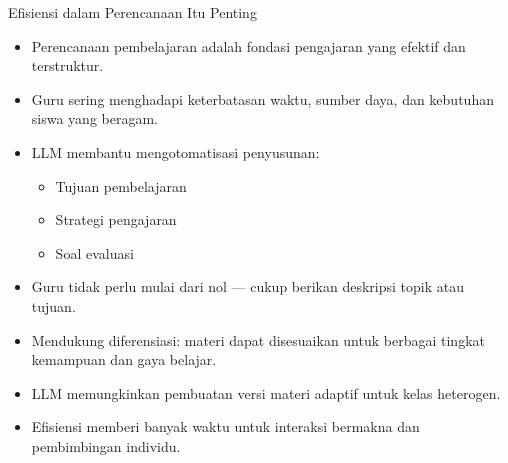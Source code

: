 \documentclass[aspectratio=169, table]{beamer}
\begin{document}
\begin{frame}[fragile]{Efisiensi dalam Perencanaan Itu Penting}
	\vspace{20pt}
	\small
	\begin{itemize}
		\item Perencanaan pembelajaran adalah fondasi pengajaran yang efektif dan terstruktur.
		
		\item Guru sering menghadapi keterbatasan waktu, sumber daya, dan kebutuhan siswa yang beragam.
		
		\item LLM membantu mengotomatisasi penyusunan:
		\begin{itemize}
			\item Tujuan pembelajaran
			\item Strategi pengajaran
			\item Soal evaluasi
		\end{itemize}
		
		\item Guru tidak perlu mulai dari nol — cukup berikan deskripsi topik atau tujuan.
		
		\item Mendukung diferensiasi: materi dapat disesuaikan untuk berbagai tingkat kemampuan dan gaya belajar.
		
		\item LLM memungkinkan pembuatan versi materi adaptif untuk kelas heterogen.
		
		\item Efisiensi memberi banyak waktu untuk interaksi bermakna dan pembimbingan individu.
	\end{itemize}
\end{frame}
\end{document}
